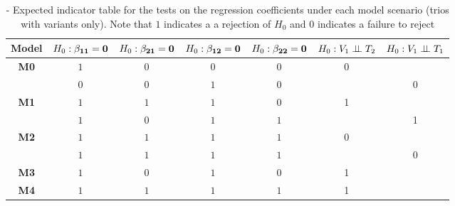 \documentclass[12pt]{report}
\begin{document}
\begin{table}[H]
\centering
\caption{- Expected indicator table for the tests on the regression coefficients under each model scenario (trios with variants only). Note that $1$ indicates a a rejection of $H_0$ and $0$ indicates a failure to reject}
\begin{tabular}{|c||c|c|c|c||c|c|}
\hline
\bf Model  & $H_0: \bf\beta_{11} = 0$  &  $H_0:\bf\beta_{21}=0$   & $H_0:\bf\beta_{12}=0$    & $H_0:\bf\beta_{22}=0$    & $ H_0: V_1 \perp \!\!\! \perp T_2$    & $H_0: V_1 \perp \!\!\! \perp T_1$    \\ \hline \hline
\bf M0      &  $1$            & $ 0$                  & $0$                & $0$                    & 0                      &           \\ \hline 
               &  $0$            & $ 0$                  & $1$                & $0$                    &                         &0           \\ \hline
\bf M1      &  $1$            & $1$                  & $1$                & $0$                   & 1                        &            \\ \hline
               &  $1$            & $0$                 & $1$                & $1$                    &                           &1       \\ \hline
\bf M2      &  $1$            & $1$                 & $1$                & $1$                   & 0                         &           \\ \hline
               &  $1$            & $1$                 & $1$                & $1$                   &                            & 0          \\ \hline
\bf M3      &  $1$            & $0$                 & $1$               & $0$                   & 1                         &            \\ \hline
\bf M4      &  $1$            & $1$                 & $1$               & $1$                  & 1                         &             \\ \hline \hline

\end{tabular}
\end{table}
\end{document}
